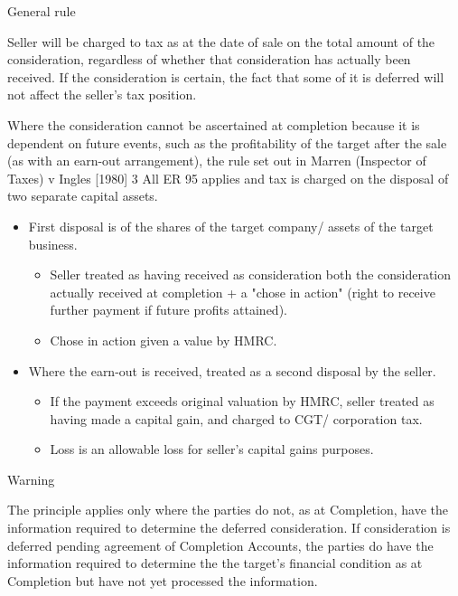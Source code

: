 \documentclass[
]{article}
\providecommand{\tightlist}{%
  \setlength{\itemsep}{0pt}\setlength{\parskip}{0pt}}
\newenvironment{env-f3fdeea8-9a69-4242-ac7f-874202f0281b}
{
    \savenotes\tcolorbox[blanker,breakable,left=5pt,borderline west={2pt}{-4pt}{orange}]
}
{
    \endtcolorbox\spewnotes
}
\newenvironment{env-9193a5b6-f9d9-4a5c-9922-4e221c0d52be}
{
    \savenotes\tcolorbox[blanker,breakable,left=5pt,borderline west={2pt}{-4pt}{darkred}]
}
{
    \endtcolorbox\spewnotes
}
\begin{document}
\begin{env-9193a5b6-f9d9-4a5c-9922-4e221c0d52be}

General rule

Seller will be charged to tax as at the date of sale on the total amount
of the consideration, regardless of whether that consideration has
actually been received. If the consideration is certain, the fact that
some of it is deferred will not affect the seller's tax position.

\end{env-9193a5b6-f9d9-4a5c-9922-4e221c0d52be}

Where the consideration cannot be ascertained at completion because it
is dependent on future events, such as the profitability of the target
after the sale (as with an earn-out arrangement), the rule set out in
Marren (Inspector of Taxes) v Ingles {[}1980{]} 3 All ER 95 applies and
tax is charged on the disposal of two separate capital assets.

\begin{itemize}
\tightlist
\item
  First disposal is of the shares of the target company/ assets of the
  target business.

  \begin{itemize}
  \tightlist
  \item
    Seller treated as having received as consideration both the
    consideration actually received at completion + a "chose in action"
    (right to receive further payment if future profits attained).
  \item
    Chose in action given a value by HMRC.
  \end{itemize}
\item
  Where the earn-out is received, treated as a second disposal by the
  seller.

  \begin{itemize}
  \tightlist
  \item
    If the payment exceeds original valuation by HMRC, seller treated as
    having made a capital gain, and charged to CGT/ corporation tax.
  \item
    Loss is an allowable loss for seller's capital gains purposes.
  \end{itemize}
\end{itemize}

\begin{env-f3fdeea8-9a69-4242-ac7f-874202f0281b}

Warning

The principle applies only where the parties do not, as at Completion,
have the information required to determine the deferred consideration.
If consideration is deferred pending agreement of Completion Accounts,
the parties do have the information required to determine the the
target's financial condition as at Completion but have not yet processed
the information.

\end{env-f3fdeea8-9a69-4242-ac7f-874202f0281b}
\end{document}
